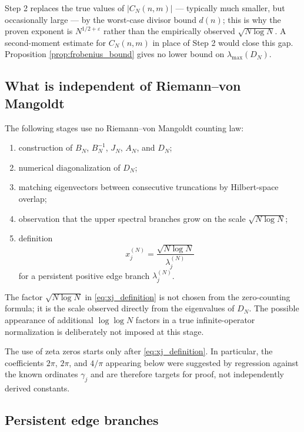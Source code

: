 \documentclass[11pt]{amsart}
\numberwithin{equation}{section}
\theoremstyle{plain}
\theoremstyle{definition}
\theoremstyle{remark}
\newcommand{\eps}{\varepsilon}
\begin{document}
Step 2 replaces the true values of $|C_N(n,m)|$ --- typically much smaller, but occasionally large --- by the worst-case divisor bound $d(n)$; this is why the proven exponent is $N^{1/2+\eps}$ rather than the empirically observed $\sqrt{N\log N}$.  A second-moment estimate for $C_N(n,m)$ in place of Step 2 would close this gap.  Proposition \ref{prop:frobenius_bound} gives no lower bound on $\lambda_{\max}(D_N)$.

\subsection{What is independent of Riemann--von Mangoldt}
\label{subsec:no_hidden_rvm}

The following stages use no Riemann--von Mangoldt counting law:
\begin{enumerate}[label=(\roman*)]
\item construction of $B_N$, $B_N^{-1}$, $J_N$, $A_N$, and $D_N$;
\item numerical diagonalization of $D_N$;
\item matching eigenvectors between consecutive truncations by Hilbert-space overlap;
\item observation that the upper spectral branches grow on the scale $\sqrt{N\log N}$;
\item definition
\begin{equation}
x_j^{(N)}=
\frac{\sqrt{N\log N}}{\lambda_j^{(N)}}
\label{eq:xj_definition}
\end{equation}
for a persistent positive edge branch $\lambda_j^{(N)}$.
\end{enumerate}
The factor $\sqrt{N\log N}$ in \eqref{eq:xj_definition} is not chosen from the zero-counting formula; it is the scale observed directly from the eigenvalues of $D_N$.  The possible appearance of additional $\log\log N$ factors in a true infinite-operator normalization is deliberately not imposed at this stage.

The use of zeta zeros starts only after \eqref{eq:xj_definition}.  In particular, the coefficients $2\pi$, $2\pi$, and $4/\pi$ appearing below were suggested by regression against the known ordinates $\gamma_j$ and are therefore targets for proof, not independently derived constants.

\subsection{Persistent edge branches}
\label{subsec:persistent_edge_branches}
\end{document}
